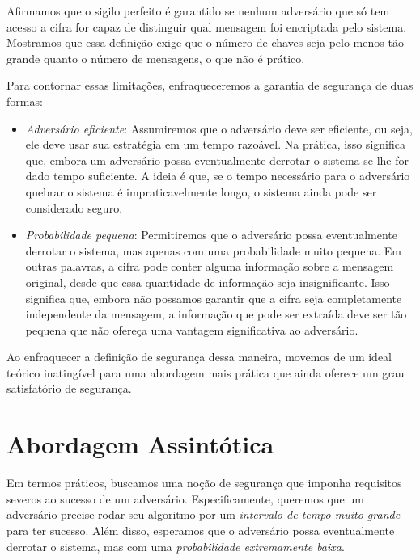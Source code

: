 Afirmamos que o sigilo perfeito é garantido se nenhum adversário que só tem acesso a cifra for capaz de distinguir qual mensagem foi encriptada pelo sistema.
Mostramos que essa definição exige que o número de chaves seja pelo menos tão grande quanto o número de mensagens, o que não é prático.

Para contornar essas limitações, enfraqueceremos a garantia de segurança de duas formas:
\begin{itemize}
\item[] {\em Adversário eficiente}:
  Assumiremos que o adversário deve ser eficiente, ou seja, ele deve usar sua estratégia em um tempo razoável.
  Na prática, isso significa que, embora um adversário possa eventualmente derrotar o sistema se lhe for dado tempo suficiente.
  A ideia é que, se o tempo necessário para o adversário quebrar o sistema é impraticavelmente longo, o sistema ainda pode ser considerado seguro.
\item[] {\em Probabilidade pequena}:
  Permitiremos que o adversário possa eventualmente derrotar o sistema, mas apenas com uma probabilidade muito pequena.
  Em outras palavras, a cifra pode conter alguma informação sobre a mensagem original, desde que essa quantidade de informação seja insignificante.
  Isso significa que, embora não possamos garantir que a cifra seja completamente independente da mensagem, a informação que pode ser extraída deve ser tão pequena que não ofereça uma vantagem significativa ao adversário.
\end{itemize}

Ao enfraquecer a definição de segurança dessa maneira, movemos de um ideal teórico inatingível para uma abordagem mais prática que ainda oferece um grau satisfatório de segurança.

\section{Abordagem Assintótica}
\label{sec:abord-assint}

Em termos práticos, buscamos uma noção de segurança que imponha requisitos severos ao sucesso de um adversário.
Especificamente, queremos que um adversário precise rodar seu algoritmo por um {\em intervalo de tempo muito grande} para ter sucesso.
Além disso, esperamos que o adversário possa eventualmente derrotar o sistema, mas com uma {\em probabilidade extremamente baixa}.

